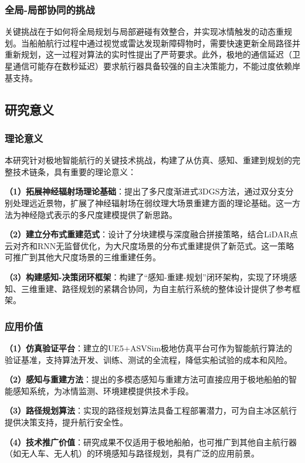 \documentclass[12pt,a4paper]{ctexbook}
\begin{document}
\subsubsection{全局-局部协同的挑战}

关键挑战在于如何将全局规划与局部避碰有效整合，并实现冰情触发的动态重规划。当船舶航行过程中通过视觉或雷达发现新障碍物时，需要快速更新全局路径并重新规划，这一过程对算法的实时性提出了严苛要求。此外，极地的通信延迟（卫星通信可能存在数秒延迟）要求航行器具备较强的自主决策能力，不能过度依赖岸基支持。

\subsection{研究意义}

\subsubsection{理论意义}

本研究针对极地智能航行的关键技术挑战，构建了从仿真、感知、重建到规划的完整技术链条，具有重要的理论意义：

\textbf{（1）拓展神经辐射场理论基础}：提出了多尺度渐进式3DGS方法，通过双分支分别处理远近景物，扩展了神经辐射场在弱纹理大场景重建方面的理论基础。这一方法为神经隐式表示的多尺度建模提供了新思路。

\textbf{（2）建立分布式重建范式}：设计了分块建模与深度融合拼接策略，结合LiDAR点云对齐和RNN无监督优化，为大尺度场景的分布式重建提供了新范式。这一策略可推广到其他大尺度场景的三维重建任务。

\textbf{（3）构建感知-决策闭环框架}：构建了``感知-重建-规划''闭环架构，实现了环境感知、三维重建、路径规划的紧耦合协同，为自主航行系统的整体设计提供了参考框架。

\subsubsection{应用价值}

\textbf{（1）仿真验证平台}：建立的UE5+ASVSim极地仿真平台可作为智能航行算法的验证基准，支持算法开发、训练、测试的全流程，降低实船试验的成本和风险。

\textbf{（2）感知与重建方法}：提出的多模态感知与重建方法可直接应用于极地船舶的智能感知系统，为冰情监测、环境建模提供技术手段。

\textbf{（3）路径规划算法}：实现的路径规划算法具备工程部署潜力，可为自主冰区航行提供决策支持，提升航行安全性。

\textbf{（4）技术推广价值}：研究成果不仅适用于极地船舶，也可推广到其他自主航行器（如无人车、无人机）的环境感知与路径规划，具有广泛的应用前景。
\end{document}
